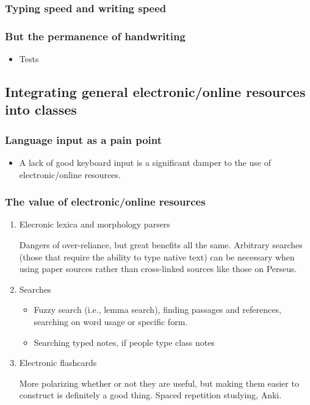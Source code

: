 \documentclass[11pt]{article}
\begin{document}
\subsubsection{Typing speed and writing speed}
\label{sec:org46c5a16}

\subsubsection{But the permanence of handwriting}
\label{sec:org1274767}

\begin{itemize}
\item Tests
\end{itemize}

\subsection{Integrating general electronic/online resources into classes}
\label{sec:org15dd161}

\subsubsection{Language input as a pain point}
\label{sec:org572cd1d}

\begin{itemize}
\item A lack of good keyboard input is a significant damper to the use of electronic/online resources.
\end{itemize}

\subsubsection{The value of electronic/online resources}
\label{sec:orgf6aff5c}

\begin{enumerate}
\item Elecronic lexica and morphology parsers
\label{sec:orgc7c34a9}

Dangers of over-reliance, but great benefits all the same. Arbitrary searches (those that require the ability to type native text) can be necessary when using paper sources rather than cross-linked sources like those on Perseus.

\item Searches
\label{sec:org3bbb1fd}

\begin{itemize}
\item Fuzzy search (i.e., lemma search), finding passages and references, searching on word usage or specific form.
\item Searching typed notes, if people type class notes
\end{itemize}

\item Electronic flashcards
\label{sec:org8a823d9}

More polarizing whether or not they are useful, but making them easier to construct is definitely a good thing. Spaced repetition studying, Anki.
\end{enumerate}
\end{document}
